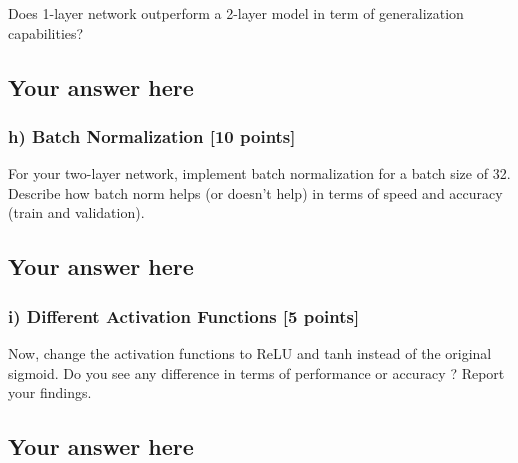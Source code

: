 \documentclass{article}
\begin{document}
Does 1-layer network outperform a 2-layer model in term of generalization capabilities?


\subsection*{Your answer here}

\subsubsection*{h) Batch Normalization [10 points]}

For your two-layer network, implement batch normalization for a batch size of 32. Describe how batch norm helps (or doesn't help) in terms of speed and accuracy (train and validation). 


\subsection*{Your answer here}

\subsubsection*{i) Different Activation Functions [5 points]}

Now, change the activation functions to ReLU and tanh instead of the original sigmoid. Do you see any difference in terms of performance or accuracy ? Report your findings.

\subsection*{Your answer here}
\end{document}
